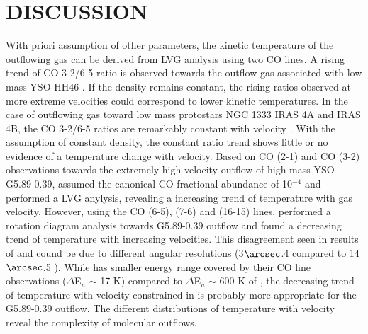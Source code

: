 \section{DISCUSSION}\label{discussion}
With priori assumption of other parameters, the kinetic temperature of the outflowing gas can be derived from LVG analysis using two CO lines. A rising trend of CO 3-2/6-5 ratio is observed towards the outflow gas associated with low mass YSO HH46 \citep{2009A&A...501..633V}. If the density remains constant, the rising ratios observed at more extreme velocities could correspond to lower kinetic temperatures. In the case of outflowing gas toward low mass protostars NGC 1333 IRAS 4A and  IRAS 4B, the CO 3-2/6-5 ratios are remarkably constant with velocity \citep{2012A&A...542A..86Y}. With the assumption of constant density, the constant ratio trend shows little or no evidence of a temperature change with velocity. Based on CO (2-1) and CO (3-2) observations towards the extremely high velocity outflow of high mass YSO G5.89-0.39, \citet{2012ApJ...744L..26S} assumed the canonical CO fractional abundance of 10$^{-4}$ and performed a LVG anylysis, revealing a increasing trend of temperature with gas velocity. However, using the CO (6-5), (7-6) and (16-15) lines, \citet{2015A&A...584A..70L} performed a rotation diagram analysis towards G5.89-0.39 outflow and found a decreasing trend of temperature with increasing velocities. This disagreement seen in results of \citet{2012ApJ...744L..26S} and \citet{2015A&A...584A..70L} cound be due to different angular resolutions (3${\arcsec}$.4 compared to 14${\arcsec}$.5 ). While \citet{2012ApJ...744L..26S} has smaller energy range covered by their CO line observations ($\Delta$E$_u$ $\sim$ 17 K) compared to $\Delta$E$_u$ $\sim$ 600 K of \citet{2015A&A...584A..70L}, the decreasing trend of temperature with velocity constrained in \citet{2015A&A...584A..70L} is probably more appropriate for the G5.89-0.39 outflow. The different distributions of temperature with velocity reveal the complexity of molecular outflows. 

